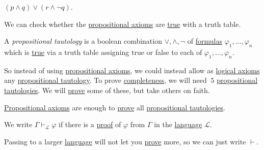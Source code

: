 \begin{prev}
	\((p \land q) \lor (r \land \lnot q)\).
\end{prev}

\begin{remark}
	We can check whether the \hyperref[def:propositional-axioms]{propositional axioms} are \hyperref[def:truth]{true} with a truth table.
\end{remark}

\begin{definition}\label{def:propositional-tautology}
	A \emph{propositional tautology} is a boolean combination \(\lor , \land , \lnot \) of \hyperref[def:formula]{formulas} \(\varphi _1, \dots , \varphi _n\) which is \hyperref[def:truth]{true} via a truth table assigning true or false to each of \(\varphi _1, \dots , \varphi _n\).
\end{definition}

So instead of using \hyperref[def:propositional-axioms]{propositional axioms}, we could instead allow as \hyperref[def:logical-axioms]{logical axioms} any \hyperref[def:propositional-tautology]{propositional tautology}. To prove \hyperref[def:complete]{completeness}, we will need \(~5\) \hyperref[def:propositional-tautology]{propositional tautologies}. We will \hyperref[def:proof]{prove} some of these, but take others on faith.

\begin{remark}
	\hyperref[def:propositional-axioms]{Propositional axioms} are enough to \hyperref[def:proof]{prove} all \hyperref[def:propositional-tautology]{propositional tautologies}.
\end{remark}

\begin{notation}
	We write \(\Gamma \vdash_\mathcal{L} \varphi \) if there is a \hyperref[def:proof]{proof} of \(\varphi \) from \(\Gamma \) in the \hyperref[def:language]{language} \(\mathcal{L} \).
\end{notation}

\begin{note}
	Passing to a larger \hyperref[def:language]{language} will not let you \hyperref[def:proof]{prove} more, so we can just write \(\vdash \).
\end{note}